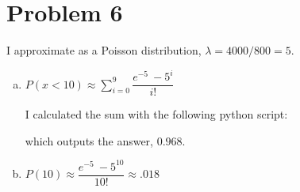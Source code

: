 \documentclass[11pt]{article}
\begin{document}
\section*{Problem 6}
I approximate as a Poisson distribution, $\lambda = 4000/800 = 5$.


\begin{enumerate}[(a)]
	\item $P( x < 10 ) \approx \sum \limits_{i=0} ^9 \dfrac{e^{-5}\ -5^{i}}{i!}$
	
	I calculated the sum with the following python script:
	
	
	
	which outputs the answer,  $0.968$.

	\item $P(10) \approx \dfrac{e^{-5}\ -5^{10}}{10!} \approx .018$
\end{enumerate}
\end{document}

